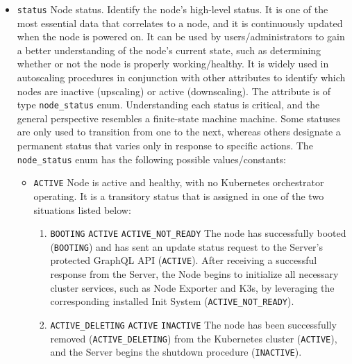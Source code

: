 \begin{itemize}
  \item \texttt{status}
    \newline
    Node status.
    \newline
    Identify the node's high-level status.
    \newline
    It is one of the most essential data that correlates to a node, and it is continuously
    updated when the node is powered on. It can be used by users/administrators
    to gain a better understanding of the node's current state, such as determining
    whether or not the node is properly working/healthy. It is widely used in
    autoscaling procedures in conjunction with other attributes to identify
    which nodes are inactive (upscaling) or active (downscaling).
    \newline
    The attribute is of type \texttt{node\_status} enum. Understanding each status
    is critical, and the general perspective resembles a finite-state machine
    machine. Some statuses are only used to transition from one to the next,
    whereas others designate a permanent status that varies only in response to
    specific actions.
    \newline
    The \texttt{node\_status} enum has the following possible values/constants:
    \begin{itemize}
      \item \texttt{ACTIVE}
        \newline
        Node is active and healthy, with no Kubernetes orchestrator operating.
        \newline
        It is a transitory status that is assigned in one of the two situations
        listed below:
        \begin{enumerate}
          \item \texttt{BOOTING}  \texttt{ACTIVE}
             \texttt{ACTIVE\_NOT\_READY}
            \newline
            The node has successfully booted (\texttt{BOOTING}) and has sent an update
            status request to the Server's protected GraphQL API (\texttt{ACTIVE}).
            After receiving a successful response from the Server, the Node
            begins to initialize all necessary cluster services, such as Node Exporter
            and K3s, by leveraging the corresponding installed Init System (\texttt{ACTIVE\_NOT\_READY}).

          \item \texttt{ACTIVE\_DELETING}  \texttt{ACTIVE}
             \texttt{INACTIVE}
            \newline
            The node has been successfully removed (\texttt{ACTIVE\_DELETING}) from
            the Kubernetes cluster (\texttt{ACTIVE}), and the Server begins the shutdown
            procedure (\texttt{INACTIVE}).
        \end{enumerate}


\end{itemize}
\end{itemize}
